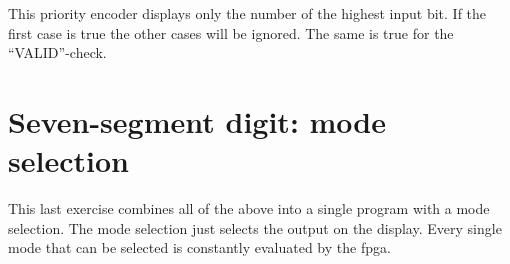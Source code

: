 This priority encoder displays only the number of the highest input bit. If the first case is true the other cases will be ignored. The same is true for the ``VALID''-check. 



\section{Seven-segment digit: mode selection}

This last exercise combines all of the above into a single program with a mode selection. The mode selection just selects the output on the display. Every single mode that can be selected is constantly evaluated by the \gls{fpga}. 



